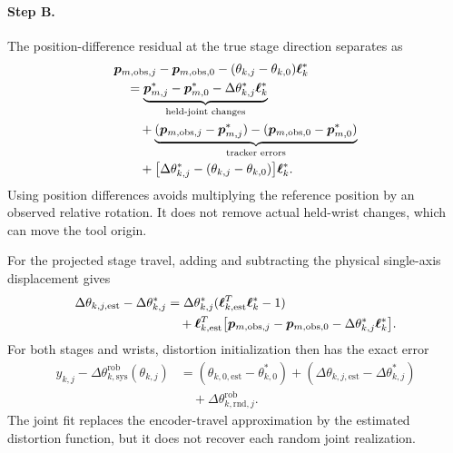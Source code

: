 \documentclass[../main.tex]{subfiles}
\begin{document}
\paragraph{Step B.}
The position-difference residual at the true stage direction separates as
\begin{equation*}
\begin{aligned}
&\bm{p}_{m,\mathrm{obs},j}-\bm{p}_{m,\mathrm{obs},0}
-(\theta_{k,j}-\theta_{k,0})\bm{\ell}_k^*\\
&\quad=\underbrace{\bm{p}_{m,j}^*-\bm{p}_{m,0}^*-\Delta\theta_{k,j}^*\bm{\ell}_k^*}_{\text{held-joint changes}}\\
&\qquad+\underbrace{(\bm{p}_{m,\mathrm{obs},j}-\bm{p}_{m,j}^*)
-(\bm{p}_{m,\mathrm{obs},0}-\bm{p}_{m,0}^*)}_{\text{tracker errors}}\\
&\qquad+\bigl[\Delta\theta_{k,j}^*-(\theta_{k,j}-\theta_{k,0})\bigr]\bm{\ell}_k^*.
\end{aligned}
\end{equation*}
Using position differences avoids multiplying the reference position by an observed relative rotation. It does not remove actual held-wrist changes, which can move the tool origin.

For the projected stage travel, adding and subtracting the physical single-axis displacement gives
\begin{equation*}
\begin{aligned}
\Delta\theta_{k,j,\mathrm{est}}-\Delta\theta_{k,j}^*
&=\Delta\theta_{k,j}^*(\bm{\ell}_{k,\mathrm{est}}^T\bm{\ell}_k^*-1)\\
&\quad+\bm{\ell}_{k,\mathrm{est}}^T
\bigl[\bm{p}_{m,\mathrm{obs},j}-\bm{p}_{m,\mathrm{obs},0}-\Delta\theta_{k,j}^*\bm{\ell}_k^*\bigr].
\end{aligned}
\end{equation*}
For both stages and wrists, distortion initialization then has the exact error
\begin{equation*}
\begin{aligned}
y_{k,j}-\Delta\theta^{\mathrm{rob}}_{k,\mathrm{sys}}(\theta_{k,j})
&=(\theta_{k,0,\mathrm{est}}-\theta_{k,0}^*)
+(\Delta\theta_{k,j,\mathrm{est}}-\Delta\theta_{k,j}^*)\\
&\quad+\Delta\theta^{\mathrm{rob}}_{k,\mathrm{rnd},j}.
\end{aligned}
\end{equation*}
The joint fit replaces the encoder-travel approximation by the estimated distortion function, but it does not recover each random joint realization.
\end{document}
